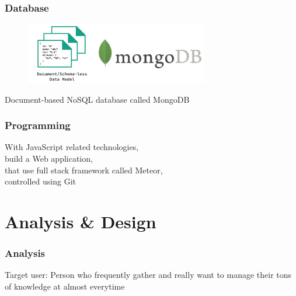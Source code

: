 \documentclass[10pt, compress]{beamer}
\begin{document}

\begin{frame}[fragile]
  \frametitle{Database}
  \centering

  \begin{figure}[ht]
    \vspace{-1cm}
    \includegraphics[width=8cm]{include/literature-database.png}
  \end{figure}

  Document-based \alert{NoSQL} database called \alert{MongoDB}

\end{frame}


\begin{frame}[fragile]
  \frametitle{Programming}
  \centering

  \begin{figure}[ht]
    \vspace{-1cm}
  \end{figure}

  With \alert{JavaScript} related technologies,\\
  build a Web application,\\
  that use full stack framework called \alert{Meteor},\\
  controlled using \alert{Git}

\end{frame}


\section{Analysis \& Design}


\begin{frame}[fragile]
  \frametitle{Analysis}

    \begin{block}{Target user:}
      Person who frequently gather and really want to manage their tons of knowledge at almost everytime
    \end{block}

\end{frame}
\end{document}
